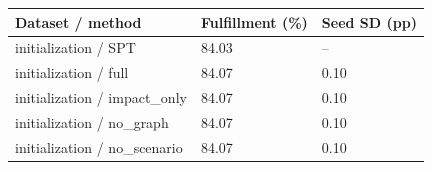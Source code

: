 \begin{tabular}{lll}
\toprule
Dataset / method & Fulfillment (\%) & Seed SD (pp)\\
\midrule
initialization / SPT & 84.03 & --\\
initialization / full & 84.07 & 0.10\\
initialization / impact\_only & 84.07 & 0.10\\
initialization / no\_graph & 84.07 & 0.10\\
initialization / no\_scenario & 84.07 & 0.10\\
\bottomrule
\end{tabular}